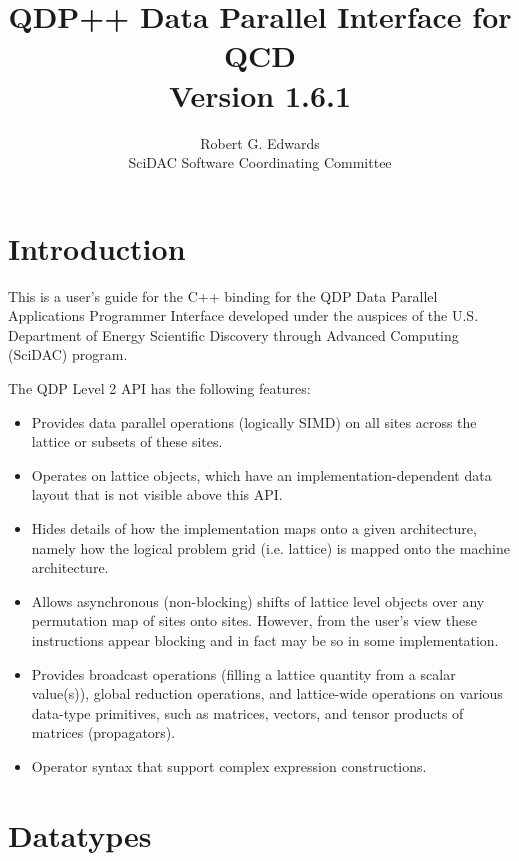 \documentclass[12pt,letterpaper]{article}
\newcommand{\cpp}{C++}
\begin{document}
\title{
   QDP++ Data Parallel Interface for QCD  \\{\large Version 1.6.1}
}
\author{Robert G. Edwards\\
SciDAC Software Coordinating Committee}

\maketitle
\section{Introduction}
This is a user's guide for the \cpp{} binding for the QDP Data Parallel
Applications Programmer Interface developed under the auspices of the
U.S. Department of Energy Scientific Discovery through Advanced
Computing (SciDAC) program.

The QDP Level 2 API has the following features:
\begin{itemize}
\item Provides data parallel operations (logically SIMD) on all sites
across the lattice or subsets of these sites.
\item Operates on lattice objects, which have an
implementation-dependent data layout that is not visible above this
API.
\item Hides details of how the implementation maps onto a given
architecture, namely how the logical problem grid (i.e. lattice) is
mapped onto the machine architecture.
\item Allows asynchronous (non-blocking) shifts of lattice level
objects over any permutation map of sites onto sites. However, from
the user's view these instructions appear blocking and in fact may be
so in some implementation.
\item Provides broadcast operations (filling a lattice quantity from a
scalar value(s)), global reduction operations, and lattice-wide
operations on various data-type primitives, such as matrices, vectors,
and tensor products of matrices (propagators).
\item
Operator syntax that support complex expression constructions.
\end{itemize}

\section{Datatypes}
\label{sec.datatypes}
\end{document}
